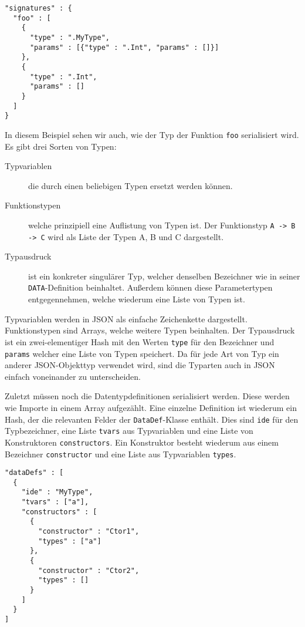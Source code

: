 \documentclass[runningheads]{llncs}
\begin{document}
\begin{verbatim}
"signatures" : {
  "foo" : [
    {
      "type" : ".MyType",
      "params" : [{"type" : ".Int", "params" : []}]
    },
    {
      "type" : ".Int",
      "params" : []
    }
  ]
}
\end{verbatim}

In diesem Beispiel sehen wir auch, wie der Typ der Funktion \verb|foo| serialisiert wird. Es gibt drei Sorten von Typen:

\begin{description}
 \item[Typvariablen] die durch einen beliebigen Typen ersetzt werden können.
 \item[Funktionstypen] welche prinzipiell eine Auflistung von Typen ist. Der Funktionstyp \verb|A -> B -> C| wird als Liste der Typen A, B und C dargestellt.
 \item[Typausdruck] ist ein konkreter singulärer Typ, welcher denselben Bezeichner wie in seiner \verb|DATA|-Definition beinhaltet. Außerdem können diese Parametertypen entgegennehmen, welche wiederum eine Liste von Typen ist.
\end{description}

Typvariablen werden in JSON als einfache Zeichenkette dargestellt. Funktionstypen sind Arrays, welche weitere Typen beinhalten. Der Typausdruck ist ein zwei-elementiger Hash mit den Werten \verb|type| für den Bezeichner und \verb|params| welcher eine Liste von Typen speichert. Da für jede Art von Typ ein anderer JSON-Objekttyp verwendet wird, sind die Typarten auch in JSON einfach voneinander zu unterscheiden.

Zuletzt müssen noch die Datentypdefinitionen serialisiert werden. Diese werden wie Importe in einem Array aufgezählt. Eine einzelne Definition ist wiederum ein Hash, der die relevanten Felder der \verb|DataDef|-Klasse enthält. Dies sind \verb|ide| für den Typbezeichner, eine Liste \verb|tvars| aus Typvariablen und eine Liste von Konstruktoren \verb|constructors|. Ein Konstruktor besteht wiederum aus einem Bezeichner \verb|constructor| und eine Liste aus Typvariablen \verb|types|.

\begin{verbatim}
"dataDefs" : [
  {
    "ide" : "MyType",
    "tvars" : ["a"],
    "constructors" : [
      {
        "constructor" : "Ctor1",
        "types" : ["a"]
      },
      {
        "constructor" : "Ctor2",
        "types" : []
      }
    ]
  }
]
\end{verbatim}
\end{document}

